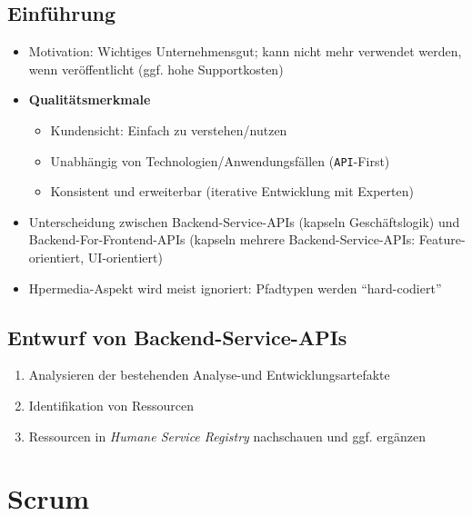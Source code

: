 \subsection{Einführung}
\begin{itemize}
	\item Motivation: Wichtiges Unternehmensgut; kann nicht mehr verwendet werden, wenn veröffentlicht (ggf. hohe Supportkosten)
	\item \textbf{Qualitätsmerkmale}
	\begin{itemize}
		\item Kundensicht: Einfach zu verstehen/nutzen
		\item Unabhängig von Technologien/Anwendungsfällen (\texttt{API}-First)
		\item Konsistent und erweiterbar (iterative Entwicklung mit Experten)
	\end{itemize}
	\item Unterscheidung zwischen Backend-Service-APIs (kapseln Geschäftslogik) und Backend-For-Frontend-APIs (kapseln mehrere Backend-Service-APIs: Feature-orientiert, UI-orientiert)
	\item Hpermedia-Aspekt wird meist ignoriert: Pfadtypen werden "`hard-codiert"'
\end{itemize}

\subsection{Entwurf von Backend-Service-APIs}
\begin{enumerate}
	\item Analysieren der bestehenden Analyse-und Entwicklungsartefakte
	\item Identifikation von Ressourcen
	\item Ressourcen in \textit{Humane Service Registry} nachschauen und ggf. ergänzen
\end{enumerate}



\section{Scrum}

